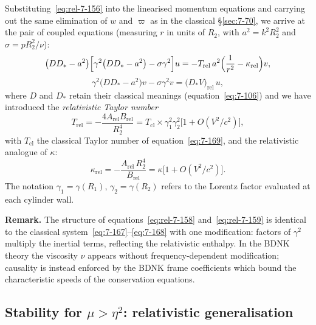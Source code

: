 Substituting~\eqref{eq:rel-7-156} into the linearised momentum
equations and carrying out the same elimination of $w$ and $\varpi$
as in the classical \S\ref{sec:7-70}, we arrive at the pair of
coupled equations (measuring $r$ in units of $R_{2}$, with
$a^{2}=k^{2}R_{2}^{2}$ and
$\sigma=pR_{2}^{2}/\nu$):
\begin{equation}
\label{eq:rel-7-158}
\bigl(DD_{*}-a^{2}\bigr)
\Bigl[\gamma^{2}\bigl(DD_{*}-a^{2}\bigr)
  - \sigma\gamma^{2}\Bigr]u
= -T_{\mathrm{rel}}\,a^{2}
  \Bigl(\frac{1}{r^{2}}-\kappa_{\mathrm{rel}}\Bigr)v,
\end{equation}
\begin{equation}
\label{eq:rel-7-159}
\gamma^{2}
  \bigl(DD_{*}-a^{2}\bigr)v
  - \sigma\gamma^{2}v
= \bigl(D_{*}V\bigr)_{\mathrm{rel}}\,u,
\end{equation}
where $D$ and $D_{*}$ retain their classical meanings
(equation~\eqref{eq:7-106}) and we have introduced the
\emph{relativistic Taylor number}
\begin{equation}
\label{eq:rel-7-160}
T_{\mathrm{rel}}
  = -\frac{4A_{\mathrm{rel}}B_{\mathrm{rel}}}{R_{2}^{4}}
  = T_{\mathrm{cl}}
    \times\gamma_{1}^{2}\gamma_{2}^{2}
    \bigl[1+O(V^{2}/c^{2})\bigr],
\end{equation}
with $T_{\mathrm{cl}}$ the classical Taylor number of
equation~\eqref{eq:7-169}, and the relativistic analogue of
$\kappa$:
\begin{equation}
\label{eq:rel-7-161}
\kappa_{\mathrm{rel}}
  = -\frac{A_{\mathrm{rel}}\,R_{2}^{4}}{B_{\mathrm{rel}}}
  = \kappa\bigl[1+O(V^{2}/c^{2})\bigr].
\end{equation}
The notation $\gamma_{1}=\gamma(R_{1})$,
$\gamma_{2}=\gamma(R_{2})$ refers to the Lorentz factor evaluated
at each cylinder wall.

\medskip
\noindent\textbf{Remark.}  The structure of
equations~\eqref{eq:rel-7-158} and~\eqref{eq:rel-7-159} is
identical to the classical system~\eqref{eq:7-167}--\eqref{eq:7-168}
with one modification: factors of $\gamma^{2}$ multiply the inertial
terms, reflecting the relativistic enthalpy.  In the BDNK theory the
viscosity $\nu$ appears without frequency-dependent modification;
causality is instead enforced by the BDNK frame coefficients which
bound the characteristic speeds of the conservation equations.

\subsection{Stability for $\mu>\eta^{2}$: relativistic
  generalisation}\label{sec:rel-7-70d}

